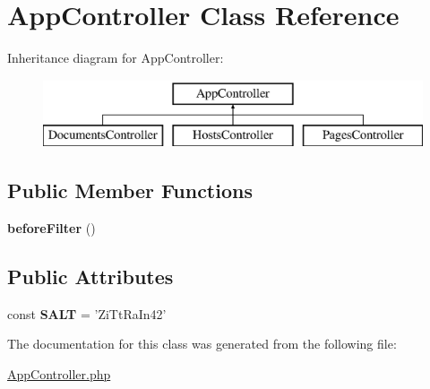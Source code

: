\hypertarget{classAppController}{
\section{\-App\-Controller \-Class \-Reference}
\label{classAppController}
}
\-Inheritance diagram for \-App\-Controller\-:\begin{figure}[H]
\begin{center}
\leavevmode
\includegraphics[height=2.000000cm]{classAppController}
\end{center}
\end{figure}
\subsection*{\-Public \-Member \-Functions}
\begin{DoxyCompactItemize}
\item 
\hypertarget{classAppController_ae6932ff72664b2b2a7f0bffc3e7f9bc7}{
{\bfseries before\-Filter} ()}
\label{classAppController_ae6932ff72664b2b2a7f0bffc3e7f9bc7}

\end{DoxyCompactItemize}
\subsection*{\-Public \-Attributes}
\begin{DoxyCompactItemize}
\item 
\hypertarget{classAppController_a7669889becf882a2fc3072131f0143e1}{
const {\bfseries \-S\-A\-L\-T} = '\-Zi\-Tt\-Ra\-In42'}
\label{classAppController_a7669889becf882a2fc3072131f0143e1}

\end{DoxyCompactItemize}


\-The documentation for this class was generated from the following file\-:\begin{DoxyCompactItemize}
\item 
\hyperlink{AppController_8php}{\-App\-Controller.\-php}\end{DoxyCompactItemize}
